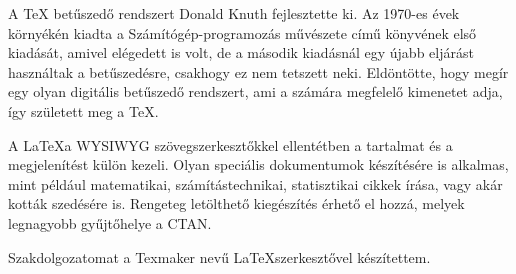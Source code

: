 A TeX betűszedő rendszert Donald Knuth fejlesztette ki.
Az 1970-es évek környékén kiadta a Számítógép-programozás művészete című könyvének első kiadását, amivel elégedett is volt, de a második kiadásnál egy újabb eljárást használtak a betűszedésre, csakhogy ez nem tetszett neki.
Eldöntötte, hogy megír egy olyan digitális betűszedő rendszert, ami a számára megfelelő kimenetet adja, így született meg a TeX.\cite{latex}

A \LaTeX a WYSIWYG szövegszerkesztőkkel ellentétben a tartalmat és a megjelenítést külön kezeli.
Olyan speciális dokumentumok készítésére is alkalmas, mint például matematikai, számítástechnikai, statisztikai cikkek írása, vagy akár kották szedésére is.
Rengeteg letölthető kiegészítés érhető el hozzá, melyek legnagyobb gyűjtőhelye a CTAN.

Szakdolgozatomat a Texmaker nevű \LaTeX szerkesztővel készítettem.